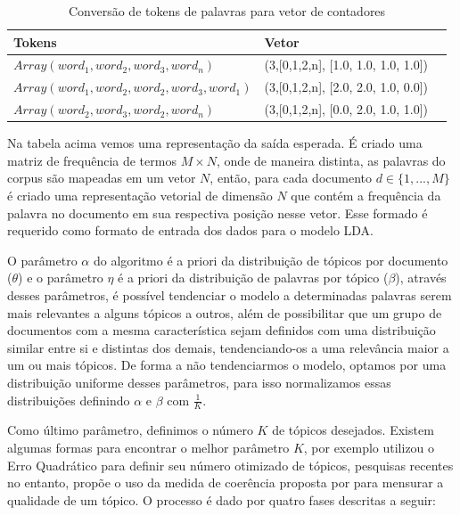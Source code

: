\documentclass[12pt,a4paper]{article}
\begin{document}
  
  \begin{table}[h]
    \centering
    \begin{tabular}{l l l}
    Tokens		&Vetor &\\
    \hline
    $Array(word_1, word_2, word_3, word_n)$						&(3,[0,1,2,n], [1.0, 1.0, 1.0, 1.0]) &\\
    $Array(word_1, word_2, word_2, word_3, word_1)$				&(3,[0,1,2,n], [2.0, 2.0, 1.0, 0.0]) &\\
    $Array(word_2, word_3, word_2, word_n)$						&(3,[0,1,2,n], [0.0, 2.0, 1.0, 1.0]) &\\
    \hline
    \end{tabular}
    \caption{Conversão de tokens de palavras para vetor de contadores}
  \end{table}
  
  
  Na tabela acima vemos uma representação da saída esperada. É criado uma matriz de frequência de termos $M \times N$, onde de maneira distinta, as palavras do corpus são mapeadas em um vetor $N$, então, para cada documento $d \in \{1,. . . , M\}$ é criado uma representação vetorial de dimensão $N$ que contém a frequência da palavra no documento em sua respectiva posição nesse vetor. Esse formado é requerido como formato de entrada dos dados para o modelo LDA.
  
  O parâmetro $\alpha$ do algoritmo é a priori da distribuição de tópicos por documento ($\theta$) e o parâmetro $\eta$ é a priori da distribuição de palavras por tópico ($\beta$), através desses parâmetros, é possível  tendenciar o modelo a determinadas palavras serem mais relevantes a alguns tópicos a outros, além de possibilitar que um grupo de documentos com a mesma característica sejam definidos com uma distribuição similar entre si e distintas dos demais, tendenciando-os a uma relevância maior a um ou mais tópicos. De forma a não tendenciarmos o modelo, optamos por uma distribuição uniforme desses parâmetros, para isso normalizamos essas distribuições definindo $\alpha$ e $\beta$ com $\frac{1}{K}$.
  
  Como último parâmetro, definimos o número $K$ de tópicos desejados. Existem algumas formas para encontrar o melhor parâmetro $K$,  por exemplo utilizou o Erro Quadrático para definir seu número otimizado de tópicos, pesquisas recentes no entanto, propõe o uso da medida de coerência proposta por  para mensurar a qualidade de um tópico. O processo é dado por quatro fases descritas a seguir:
  
\end{document}
